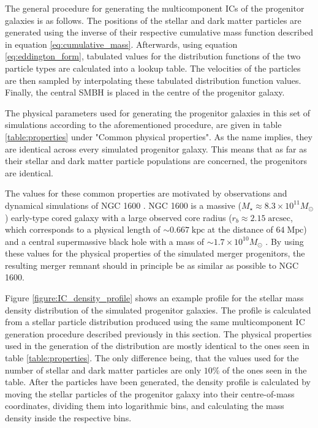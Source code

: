 \documentclass[english, twoside]{HYgradu}
\begin{document}
The general procedure for generating the multicomponent ICs of the progenitor galaxies is as follows. The positions of the stellar and dark matter particles are generated using the inverse of their respective cumulative mass function described in equation \ref{eq:cumulative_mass}. Afterwards, using equation \ref{eq:eddington_form}, tabulated values for the distribution functions of the two particle types are calculated into a lookup table. The velocities of the particles are then sampled by interpolating these tabulated distribution function values. Finally, the central SMBH is placed in the centre of the progenitor galaxy.

The physical parameters used for generating the progenitor galaxies in this set of simulations according to the aforementioned procedure, are given in table \ref{table:properties} under "Common physical properties". As the name implies, they are identical across every simulated progenitor galaxy. This means that as far as their stellar and dark matter particle populations are concerned, the progenitors are identical. 

The values for these common properties are motivated by observations and dynamical simulations of NGC 1600 \citep{Rantala2018}. NGC 1600 is a massive ($M_\star \approx 8.3 \times 10^{11} M_\odot$) early-type cored galaxy with a large observed core radius ($r_b \approx 2.15 \; \mathrm{arcsec}$, which corresponds to a physical length of $\sim 0.667 \; \mathrm{kpc}$ at the distance of $64 \; \mathrm{Mpc}$) and a central supermassive black hole with a mass of $\sim 1.7 \times 10^{10} M_\odot$ \citep{Thomas2016}. By using these values for the physical properties of the simulated merger progenitors, the resulting merger remnant should in principle be as similar as possible to NGC 1600.

Figure \ref{figure:IC_density_profile} shows an example profile for the stellar mass density distribution of the simulated progenitor galaxies. The profile is calculated from a stellar particle distribution produced using the same multicomponent IC generation procedure described previously in this section. The physical properties used in the generation of the distribution are mostly identical to the ones seen in table \ref{table:properties}. The only difference being, that the values used for the number of stellar and dark matter particles are only $10 \%$  of the ones seen in the table. After the particles have been generated, the density profile is calculated by moving the stellar particles of the progenitor galaxy into their centre-of-mass coordinates, dividing them into logarithmic bins, and calculating the mass density inside the respective bins.
\end{document}
